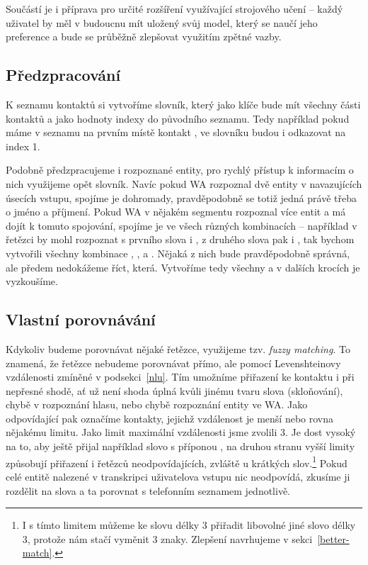 Součástí je i příprava pro určité rozšíření využívající strojového učení -- každý
uživatel by měl v budoucnu mít uložený svůj model, který se naučí jeho preference a bude se
průběžně zlepšovat využitím zpětné vazby.

\subsection{Předzpracování}\label{preprocess}

K seznamu kontaktů si vytvoříme slovník,
který jako klíče bude mít všechny části kontaktů a jako hodnoty indexy do původního
seznamu. Tedy například pokud máme v seznamu na prvním místě kontakt ,
ve slovníku budou  i  odkazovat na index 1.

Podobně předzpracujeme i rozpoznané entity, pro rychlý přístup k informacím o nich
využijeme opět slovník. Navíc pokud WA rozpoznal dvě entity v navazujících úsecích vstupu,
spojíme je dohromady, pravděpodobně se totiž jedná právě třeba o jméno a příjmení.
Pokud WA v nějakém segmentu rozpoznal více entit a má dojít k tomuto spojování, spojíme
je ve všech různých kombinacích -- například v řetězci  by mohl
rozpoznat s prvního slova  i , z druhého slova pak  i
, tak bychom vytvořili všechny kombinace , ,
 a . Nějaká z nich bude pravděpodobně správná, ale
předem nedokážeme říct, která. Vytvoříme tedy všechny a v dalších krocích
je vyzkoušíme.

\subsection{Vlastní porovnávání}\label{subsection-matching}

Kdykoliv budeme porovnávat nějaké řetězce, využijeme tzv. \textit{fuzzy matching}.
To znamená, že řetězce nebudeme porovnávat přímo, ale pomocí Levenshteinovy vzdálenosti
zmíněné v podsekci~\ref{nlu}. Tím umožníme přiřazení ke kontaktu i při nepřesné shodě,
ať už není shoda úplná kvůli jinému tvaru slova (skloňování), chybě v rozpoznání
hlasu, nebo chybě rozpoznání entity ve WA. Jako odpovídající pak označíme kontakty,
jejichž vzdálenost je menší nebo rovna nějakému limitu. Jako limit maximální vzdálenosti
jsme zvolili 3. Je dost vysoký na to, aby ještě přijal například slovo s příponou
, na druhou stranu vyšší limity způsobují přiřazení i řetězců neodpovídajících,
zvláště u krátkých slov.\footnote{I s tímto limitem můžeme ke slovu délky 3 přiřadit libovolné jiné
    slovo délky 3, protože nám stačí vyměnit 3 znaky. Zlepšení navrhujeme v sekci~\ref{better-match}.}
Pokud celé entitě nalezené v transkripci uživatelova vstupu nic neodpovídá,
zkusíme ji rozdělit na slova a ta porovnat s telefonním seznamem jednotlivě.


